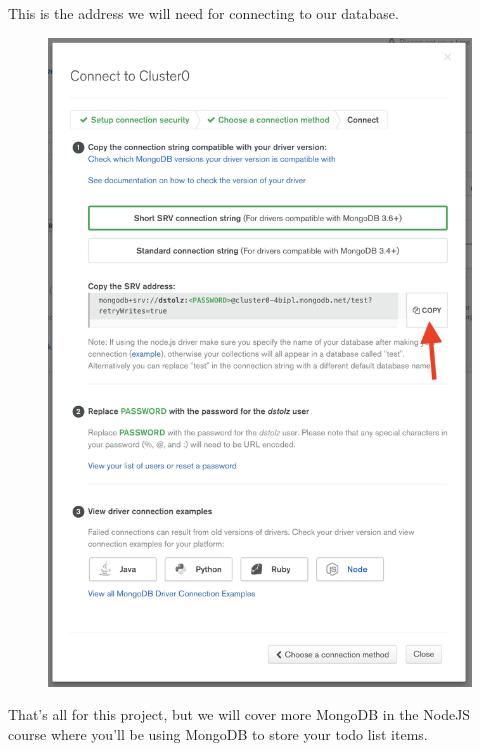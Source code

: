 \documentclass{42-en}
\begin{document}
\newpage
This is the address we will need for connecting to our database.
\begin{figure}[H]
    \begin{center}
        \includegraphics[width=14cm]{WEB/mongo_12.png}
    \end{center}
\end{figure}
That’s all for this project, but we will cover more MongoDB in the NodeJS course where you’ll be using MongoDB to store your todo list items.

\end{document}
